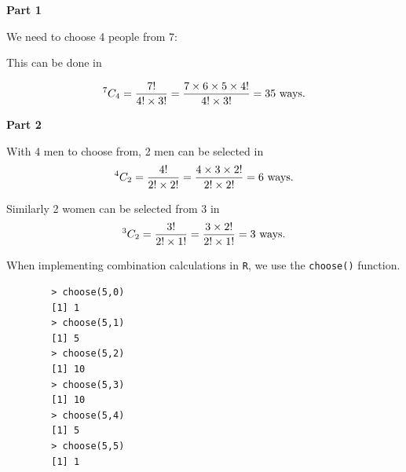 \documentclass[12pt]{report}
\begin{document}
	{\Large
		
		\textbf{Part 1}
		
		We need to choose 4 people from 7:
		
		This can be done in
		
		\[
		^7 C_4  = {7!  \over 4! \times 3!} =  {7 \times 6 \times 5 \times 4!  \over 4! \times 3!} = 35 \mbox{ ways.}
		\]
		
		
		\textbf{Part 2}
		
		With 4 men to choose from, 2 men can be selected in \[
		^4 C_2  = {4!  \over 2! \times 2!} =  {4 \times 3 \times 2!  \over 2! \times 2!} = 6\mbox{ ways.}
		\]
		
		Similarly 2 women can be selected from 3 in
		\[
		^3 C_2  = {3!  \over 2! \times1!} =  {3 \times 2!  \over 2! \times 1!} = 3\mbox{ ways.}
		\]
		
	}
	
		When implementing combination calculations in \texttt{R}, we use the \texttt{choose()} function.
		
		\begin{verbatim}
		> choose(5,0)
		[1] 1
		> choose(5,1)
		[1] 5
		> choose(5,2)
		[1] 10
		> choose(5,3)
		[1] 10
		> choose(5,4)
		[1] 5
		> choose(5,5)
		[1] 1
		\end{verbatim}
		
\end{document}
